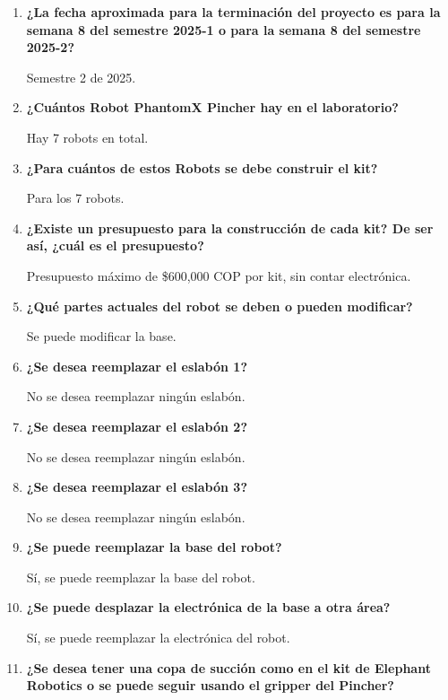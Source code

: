 \begin{enumerate}[label=\arabic*.]
    \item \textbf{¿La fecha aproximada para la terminación del proyecto es para la semana 8 del semestre 2025-1 o para la semana 8 del semestre 2025-2?}
    
    Semestre 2 de 2025.
    
    \item \textbf{¿Cuántos Robot PhantomX Pincher hay en el laboratorio?}
    
    Hay 7 robots en total.
    
    \item \textbf{¿Para cuántos de estos Robots se debe construir el kit?}
    
    Para los 7 robots.
    
    \item \textbf{¿Existe un presupuesto para la construcción de cada kit? De ser así, ¿cuál es el presupuesto?}
    
    Presupuesto máximo de \$600,000 COP por kit, sin contar electrónica.
    
    \item \textbf{¿Qué partes actuales del robot se deben o pueden modificar?}
    
    Se puede modificar la base.
    
    \item \textbf{¿Se desea reemplazar el eslabón 1?}
    
    No se desea reemplazar ningún eslabón.
    
    \item \textbf{¿Se desea reemplazar el eslabón 2?}
    
    No se desea reemplazar ningún eslabón.
    
    \item \textbf{¿Se desea reemplazar el eslabón 3?}
    
    No se desea reemplazar ningún eslabón.
    
    \item \textbf{¿Se puede reemplazar la base del robot?}
    
    Sí, se puede reemplazar la base del robot.
    
    \item \textbf{¿Se puede desplazar la electrónica de la base a otra área?}
    
    Sí, se puede reemplazar la electrónica del robot.
    
    \item \textbf{¿Se desea tener una copa de succión como en el kit de Elephant Robotics o se puede seguir usando el gripper del Pincher?}
    

\end{enumerate}
